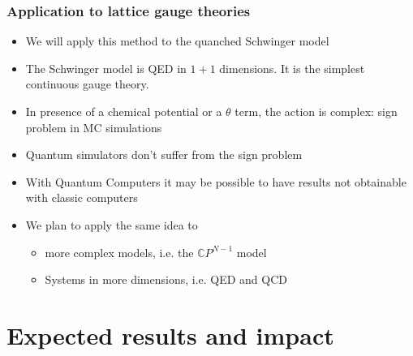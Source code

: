 \documentclass[10pt,t,xcolor=dvipsnames,aspectratio=169]{beamer}
\begin{document}
\begin{frame}
    \frametitle{Application to lattice gauge theories}
    \begin{itemize}
        \item
            We will apply this method to the quanched Schwinger model
        \item
            The Schwinger model is QED in $1+1$ dimensions. It is the simplest continuous gauge theory.
        \item
            In presence of a chemical potential or a $\theta$ term, the action is complex: sign problem in MC simulations
        \item
            Quantum simulators don't suffer from the sign problem
        \item
            With Quantum Computers it may be possible to have results not obtainable with classic computers
        \item
            We plan to apply the same idea to
            \begin{itemize}
                \item more complex models, i.e. the $\mathbb CP^{N-1}$ model
                \item Systems in more dimensions, i.e. QED and QCD
            \end{itemize}
    \end{itemize}
\end{frame}


\section{Expected results and impact}
\end{document}

